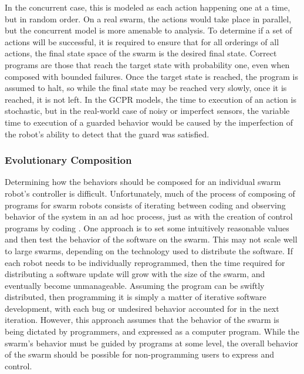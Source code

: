\documentclass[]{article}
\begin{document}
In the concurrent case, this is modeled as each action happening one at a time, but in random order. 
On a real swarm, the actions would take place in parallel, but the concurrent model is more amenable to analysis. 
To determine if a set of actions will be successful, it is required to ensure that for all orderings of all actions, the final state space of the swarm is the desired final state. 
Correct programs are those that reach the target state with probability one, even when composed with bounded failures. 
Once the target state is reached, the program is assumed to halt, so while the final state may be reached very slowly, once it is reached, it is not left. 
In the GCPR models, the time to execution of an action is stochastic, but in the real-world case of noisy or imperfect sensors, the variable time to execution of a guarded behavior would be caused by the imperfection of the robot's ability to detect that the guard was satisfied. 


\subsubsection{Evolutionary Composition}

Determining how the behaviors should be composed for an individual swarm robot's controller is difficult. 
Unfortunately, much of the process of composing of programs for swarm robots consists of iterating between coding and observing behavior of the system in an ad hoc process, just as with the creation of control programs by coding \cite{palmer2005behavioral}. 
One approach is to set some intuitively reasonable values and then test the behavior of the software on the swarm. 
This may not scale well to large swarms, depending on the technology used to distribute the software. 
If each robot needs to be individually reprogrammed, then the time required for distributing a software update will grow with the size of the swarm, and eventually become unmanageable. 
Assuming the program can be swiftly distributed, then programming it is simply a matter of iterative software development, with each bug or undesired behavior accounted for in the next iteration. 
However, this approach assumes that the behavior of the swarm is being dictated by programmers, and expressed as a computer program. 
While the swarm's behavior must be guided by programs at some level, the overall behavior of the swarm should be possible for non-programming users to express and control. 
\end{document}
